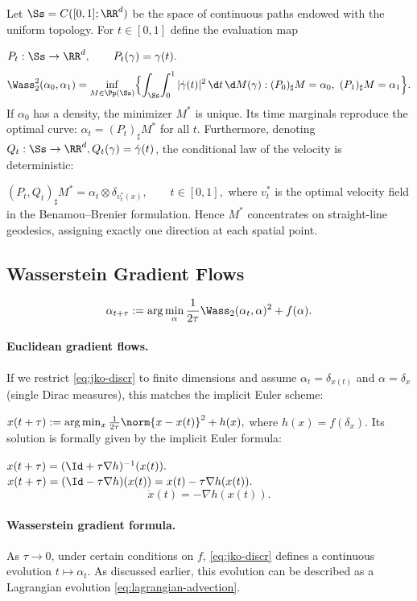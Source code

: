 \begin{rem}
Let $\Ss=C([0,1];\RR^d)$ be the space of continuous paths endowed with the uniform topology. For $t\in[0,1]$ define the evaluation map

\(P_t: \Ss\to\RR^d,\qquad P_t(\gamma)=\gamma(t).\)
\[
\Wass_2^2(\alpha_0,\alpha_1)=\inf_{M\in\Pp(\Ss)}\Bigl\{\int_{\Ss}\!\int_0^1|\dot\gamma(t)|^2\,\d t\,\d M(\gamma): (P_0)_{\sharp}M=\alpha_0,\ (P_1)_{\sharp}M=\alpha_1\Bigr\}.
\]
If $\alpha_0$ has a density, the minimizer $M^*$ is unique. Its time marginals reproduce the optimal curve: $\alpha_t=(P_t)_{\sharp}M^*$ for all $t$. Furthermore, denoting $Q_t: \Ss\to\RR^d, Q_t(\gamma)=\dot\gamma(t)$, the conditional law of the velocity is deterministic:

\((P_t, Q_t)_{\sharp}M^* = \alpha_t\otimes\delta_{v_t^*(x)},\qquad t\in[0,1],\)
where $v_t^*$ is the optimal velocity field in the Benamou--Brenier formulation. Hence $M^*$ concentrates on straight-line geodesics, assigning exactly one direction at each spatial point.

\end{rem}
\subsection{Wasserstein Gradient Flows}
\begin{equation}
\alpha_{t+\tau}:= \arg\min_\alpha \frac{1}{2 \tau} \Wass_2(\alpha_t, \alpha)^2 + f(\alpha). \label{eq:jko-discr}
\end{equation}
\paragraph{Euclidean gradient flows.}
If we restrict \eqref{eq:jko-discr} to finite dimensions and assume $\alpha_t = \delta_{x(t)}$ and $\alpha = \delta_x$ (single Dirac measures), this matches the implicit Euler scheme:

\(x(t+\tau):= \arg\min_x \frac{1}{2 \tau} \norm{x - x(t)}^2 + h(x),\)
where $h(x) = f(\delta_x)$. Its solution is formally given by the implicit Euler formula:

\(x(t+\tau) = (\Id + \tau \nabla h)^{-1}(x(t)).\)
\(x(t+\tau) = (\Id - \tau \nabla h)(x(t)) = x(t) - \tau \nabla h(x(t)).\)
\begin{equation}
\dot{x}(t) = -\nabla h(x(t)). \label{eq:grad-flow-classical}
\end{equation}
\paragraph{Wasserstein gradient formula.}
As $\tau \to 0$, under certain conditions on $f$, \eqref{eq:jko-discr} defines a continuous evolution $t \mapsto \alpha_t$. As discussed earlier, this evolution can be described as a Lagrangian evolution \eqref{eq:lagrangian-advection}.

